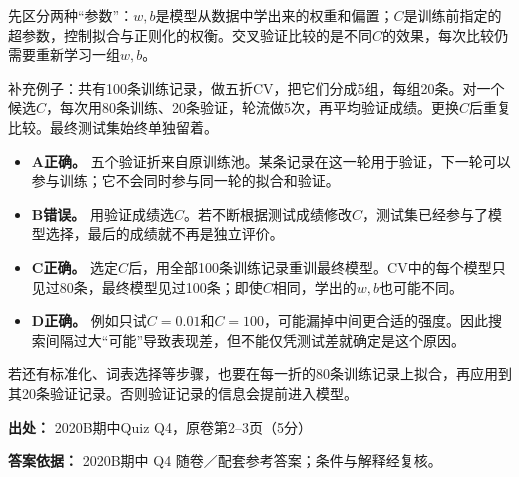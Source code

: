 先区分两种“参数”：\(w,b\)是模型从数据中学出来的权重和偏置；\(C\)是训练前指定的超参数，控制拟合与正则化的权衡。交叉验证比较的是不同\(C\)的效果，每次比较仍需要重新学习一组\(w,b\)。


补充例子：共有100条训练记录，做五折CV，把它们分成5组，每组20条。对一个候选\(C\)，每次用80条训练、20条验证，轮流做5次，再平均验证成绩。更换\(C\)后重复比较。最终测试集始终单独留着。



\begin{itemize}

\item \textbf{A正确。} 五个验证折来自原训练池。某条记录在这一轮用于验证，下一轮可以参与训练；它不会同时参与同一轮的拟合和验证。

\item \textbf{B错误。} 用验证成绩选\(C\)。若不断根据测试成绩修改\(C\)，测试集已经参与了模型选择，最后的成绩就不再是独立评价。

\item \textbf{C正确。} 选定\(C\)后，用全部100条训练记录重训最终模型。CV中的每个模型只见过80条，最终模型见过100条；即使\(C\)相同，学出的\(w,b\)也可能不同。

\item \textbf{D正确。} 例如只试\(C=0.01\)和\(C=100\)，可能漏掉中间更合适的强度。因此搜索间隔过大“可能”导致表现差，但不能仅凭测试差就确定是这个原因。

\end{itemize}


若还有标准化、词表选择等步骤，也要在每一折的80条训练记录上拟合，再应用到其20条验证记录。否则验证记录的信息会提前进入模型。


\textbf{出处：} 2020B期中Quiz Q4，原卷第2–3页（5分）


\textbf{答案依据：} 2020B期中 Q4 随卷／配套参考答案；条件与解释经复核。

